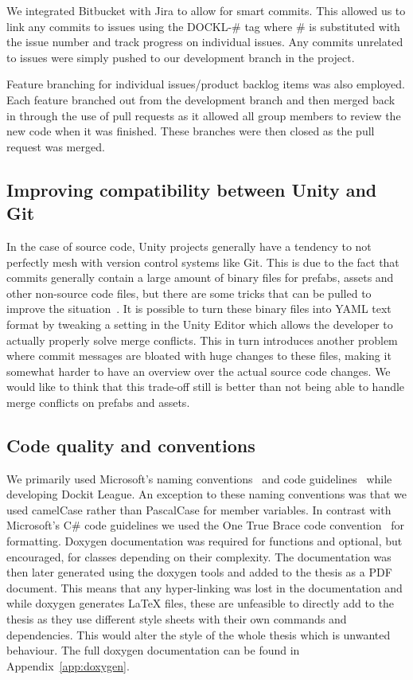 We integrated Bitbucket with Jira to allow for smart commits. This allowed us to link any commits to issues using the DOCKL-\# tag where \# is substituted with the issue number and track progress on individual issues. Any commits unrelated to issues were simply pushed to our development branch in the project. 
    
Feature branching for individual issues/product backlog items was also employed. Each feature branched out from the development branch and then merged back in through the use of pull requests as it allowed all group members to review the new code when it was finished. These branches were then closed as the pull request was merged. 

\subsection{Improving compatibility between Unity and Git}
\label{sec:unityGit}
In the case of source code, Unity projects generally have a tendency to not perfectly mesh with version control systems like Git. This is due to the fact that commits generally contain a large amount of binary files for prefabs, assets and other non-source code files, but there are some tricks that can be pulled to improve the situation~\cite{unityGit}. It is possible to turn these binary files into YAML text format by tweaking a setting in the Unity Editor which allows the developer to actually properly solve merge conflicts. This in turn introduces another problem where commit messages are bloated with huge changes to these files, making it somewhat harder to have an overview over the actual source code changes. We would like to think that this trade-off still is better than not being able to handle merge conflicts on prefabs and assets. 

\subsection{Code quality and conventions}
We primarily used Microsoft's naming conventions~\cite{microsoftNamingGuidelines} and code guidelines~\cite{microsoftCodeGuidelines} while developing Dockit League. An exception to these naming conventions was that we used camelCase rather than PascalCase for member variables. In contrast with Microsoft's C\# code guidelines we used the One True Brace code convention~\cite{oneTrueBraceStyle} for formatting. 
Doxygen documentation was required for functions and optional, but encouraged, for classes depending on their complexity. The documentation was then later generated using the doxygen tools and added to the thesis as a PDF document. This means that any hyper-linking was lost in the documentation and while doxygen generates LaTeX files, these are unfeasible to directly add to the thesis as they use different style sheets with their own commands and dependencies. This would alter the style of the whole thesis which is unwanted behaviour. The full doxygen documentation can be found in Appendix~\ref{app:doxygen}. 

